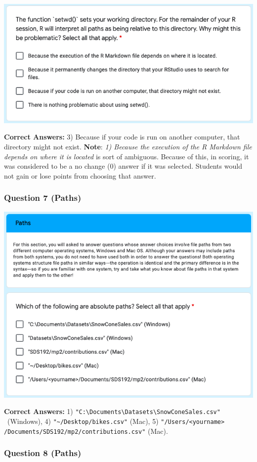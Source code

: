 \documentclass[12pt,twoside]{reedthesis}
\begin{document}
\includegraphics[width=0.8\linewidth]{figure/appendix/test-6}

\textbf{Correct Answers:} 3) Because if your code is run on another computer, that directory might not exist. \textbf{Note}: \emph{1) Because the execution of the R Markdown file depends on where it is located} is sort of ambiguous. Because of this, in scoring, it was considered to be a no change (0) answer if it was selected. Students would not gain or lose points from choosing that answer.

\hypertarget{question-7-paths}{%
\subsubsection{Question 7 (Paths)}\label{question-7-paths}}

\includegraphics[width=0.8\linewidth]{figure/appendix/test-7}

\textbf{Correct Answers:} 1) \texttt{"C:\textbackslash{}Documents\textbackslash{}Datasets\textbackslash{}SnowConeSales.csv"} ~(Windows), 4) \texttt{"\textasciitilde{}/Desktop/bikes.csv"} (Mac), 5) \texttt{"/Users/\textless{}yourname\textgreater{}} ~
\texttt{/Documents/SDS192/mp2/contributions.csv"} (Mac).

\hypertarget{question-8-paths}{%
\subsubsection{Question 8 (Paths)}\label{question-8-paths}}
\end{document}
